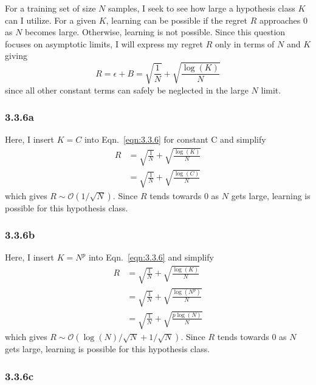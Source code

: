 \documentclass[12pt]{amsart}
\begin{document}
For a training set of size $N$ samples, I seek to see how large a hypothesis class $K$ can I utilize.  For a given $K$, learning can be possible if the regret $R$ approaches 0 as $N$ becomes large.  Otherwise, learning is not possible.  Since this question focuses on asymptotic limits, I will express my regret $R$ only in terms of $N$ and $K$ giving
\begin{equation} \label{eqn:3.3.6}
R = \epsilon + B = \sqrt{\frac{1}{N}} + \sqrt{\frac{\log(K)}{N}}
\end{equation}
since all other constant terms can safely be neglected in the large $N$ limit.

\subsubsection*{3.3.6a}

Here, I insert $K = C$ into Eqn.~\ref{eqn:3.3.6} for constant C and simplify
\begin{equation}
\begin{split}
R & = \sqrt{\frac{1}{N}} + \sqrt{\frac{\log(K)}{N}} \\
& = \sqrt{\frac{1}{N}} + \sqrt{\frac{\log(C)}{N}}
\end{split}
\end{equation}
which gives $R {\sim} \mathcal{O}(1/\sqrt{N})$.  Since $R$ tends towards 0 as $N$ gets large, learning is possible for this hypothesis class.

\subsubsection*{3.3.6b}

Here, I insert $K = N^p$ into Eqn.~\ref{eqn:3.3.6} and simplify
\begin{equation}
\begin{split}
R & = \sqrt{\frac{1}{N}} + \sqrt{\frac{\log(K)}{N}} \\
& = \sqrt{\frac{1}{N}} + \sqrt{\frac{\log(N^p)}{N}} \\
& = \sqrt{\frac{1}{N}} + \sqrt{\frac{p\log(N)}{N}}
\end{split}
\end{equation}
which gives $R {\sim} \mathcal{O}(\log(N)/\sqrt{N} + 1/\sqrt{N})$.  Since $R$ tends towards 0 as $N$ gets large, learning is possible for this hypothesis class.

\subsubsection*{3.3.6c}
\end{document}
